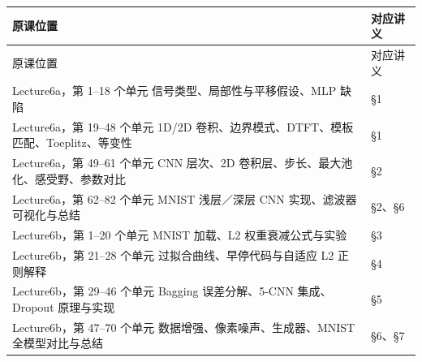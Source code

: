 \begingroup\small\setlength{\tabcolsep}{3pt}\renewcommand{\arraystretch}{1.22}
\begin{longtable}{@{}>{\raggedright\arraybackslash}p{}>{\raggedright\arraybackslash}p{}@{}}
\toprule
原课位置 & 对应讲义 \\
\midrule\endfirsthead
原课位置 & 对应讲义 \\
\midrule\endhead
\bottomrule\endfoot
Lecture6a，第 1–18 个单元 信号类型、局部性与平移假设、MLP 缺陷 & §1 \\
Lecture6a，第 19–48 个单元 1D/2D 卷积、边界模式、DTFT、模板匹配、Toeplitz、等变性 & §1 \\
Lecture6a，第 49–61 个单元 CNN 层次、2D 卷积层、步长、最大池化、感受野、参数对比 & §2 \\
Lecture6a，第 62–82 个单元 MNIST 浅层／深层 CNN 实现、滤波器可视化与总结 & §2、§6 \\
Lecture6b，第 1–20 个单元 MNIST 加载、L2 权重衰减公式与实验 & §3 \\
Lecture6b，第 21–28 个单元 过拟合曲线、早停代码与自适应 L2 正则解释 & §4 \\
Lecture6b，第 29–46 个单元 Bagging 误差分解、5-CNN 集成、Dropout 原理与实现 & §5 \\
Lecture6b，第 47–70 个单元 数据增强、像素噪声、生成器、MNIST 全模型对比与总结 & §6、§7 \\
\end{longtable}\endgroup
